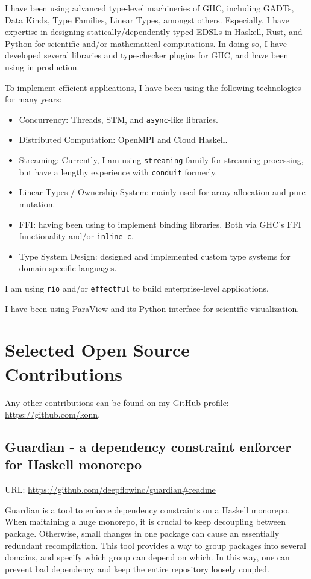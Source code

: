 \documentclass{moderncv}
\begin{document}
I have been using advanced type-level machineries of GHC, including GADTs, Data Kinds, Type Families, Linear Types, amongst others.
Especially, I have expertise in designing statically/dependently-typed EDSLs in Haskell, Rust, and Python for scientific and/or mathematical computations.
In doing so, I have developed several libraries and type-checker plugins for GHC, and have been using in production.

To implement efficient applications, I have been using the following technologies for many years:

\begin{itemize}
  \item Concurrency: Threads, STM, and \texttt{async}-like libraries.
  \item Distributed Computation: OpenMPI and Cloud Haskell.
  \item Streaming: Currently, I am using \texttt{streaming} family for streaming processing, but have a lengthy experience with \texttt{conduit} formerly.
  \item Linear Types / Ownership System: mainly used for array allocation and pure mutation.
  \item FFI: having been using to implement binding libraries. Both via GHC's FFI functionality and/or \texttt{inline-c}.
  \item Type System Design: designed and implemented custom type systems for domain-specific languages.
\end{itemize}

I am using \texttt{rio} and/or \texttt{effectful} to build enterprise-level applications.

I have been using ParaView and its Python interface for scientific visualization.

\section{Selected Open Source Contributions}

Any other contributions can be found on my GitHub profile: \url{https://github.com/konn}.

\subsection{Guardian - a dependency constraint enforcer for Haskell monorepo}

URL: \url{https://github.com/deepflowinc/guardian#readme}

Guardian is a tool to enforce dependency constraints on a Haskell monorepo.
When maitaining a huge monorepo, it is crucial to keep decoupling between package. Otherwise, small changes in one package can cause an essentially redundant recompilation.
This tool provides a way to group packages into several domains, and specify which group can depend on which. In this way, one can prevent bad dependency and keep the entire repository loosely coupled.
\end{document}
